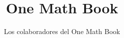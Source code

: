 \documentclass[11pt,a4paper,twoside,openany]{book}
\title{One Math Book}
\author{Los colaboradores del One Math Book}
\date{\bookdate}
\begin{document}
\frontmatter



\tableofcontents

\mainmatter





\appendix
\part{\omsolutionspart}




\backmatter
\printindex
\end{document}
